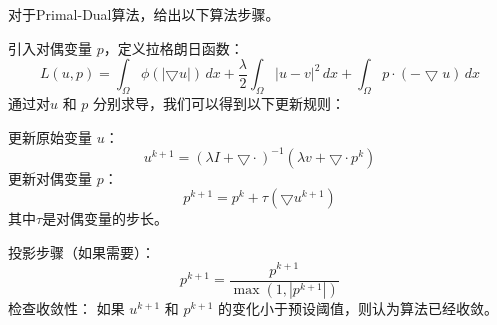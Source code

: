对于Primal-Dual算法，给出以下算法步骤。

引入对偶变量 \( p \)，定义拉格朗日函数：
\[ L(u, p) = \int_{\Omega} \phi(|\bigtriangledown u|) \, dx + \frac{\lambda}{2} \int_{\Omega} |u - v|^2 \, dx + \int_{\Omega} p \cdot (-\bigtriangledown u) \, dx \tag{12}\]
通过对$u$ 和 $p$ 分别求导，我们可以得到以下更新规则：

更新原始变量 \( u \)：
\[ u^{k+1} = (\lambda I + \bigtriangledown \cdot)^{-1} (\lambda v + \bigtriangledown \cdot p^k)\tag{13} \] 
更新对偶变量 \( p \)：
\[ p^{k+1} = p^k + \tau (\bigtriangledown u^{k+1})\tag{14} \]
其中$\tau$是对偶变量的步长。

投影步骤（如果需要）：
\[ p^{k+1} = \frac{p^{k+1}}{\max(1, |p^{k+1}|)} \tag{15}\]
检查收敛性：
如果 \( u^{k+1} \) 和 \( p^{k+1} \) 的变化小于预设阈值，则认为算法已经收敛。
